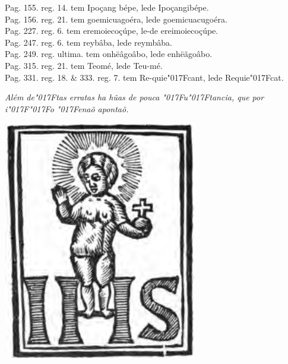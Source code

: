 \documentclass[openany,titlepage,12pt]{book}
\newcommand{\lgS}{\char"017F}
\newcommand{\lgSS}{\char"017F\char"017F}
\begin{document}
Pag. 155. reg. 14. tem Ipoçang bépe, lede Ipoçangibépe.\\
Pag. 156. reg. 21. tem goemicuagoéra,\linebreak
lede goemicuacugoéra.\\
Pag. 227. reg. 6. tem eremoiecoçúpe, le-\linebreak de
ereimoiecoçúpe.\\
Pag. 247. reg. 6. tem reybâba, lede reymbâba.\\
Pag. 249. reg. ultima. tem onhëâgoâbo, lede enhëãgoâbo.\\
Pag. 315. reg. 21. tem Teomé, lede Teu-\linebreak mé.\\
Pag. 331. reg. 18. \& 333. reg. 7. tem Re-quie\lgS cant, lede 
Requie\lgS cat.
\vspace{\baselineskip}
\begin{center}
    \textit{Além de\lgS tas erratas ha hũas de pouca
    \lgS u\lgS tancia, que por i\lgSS o \lgS enaõ apontaõ.}
\end{center}

\newpage
\vspace*{140pt}
\begin{center}
    \includegraphics[scale=0.33]{08.jesus.png}
\end{center}
\newpage
\end{document}
